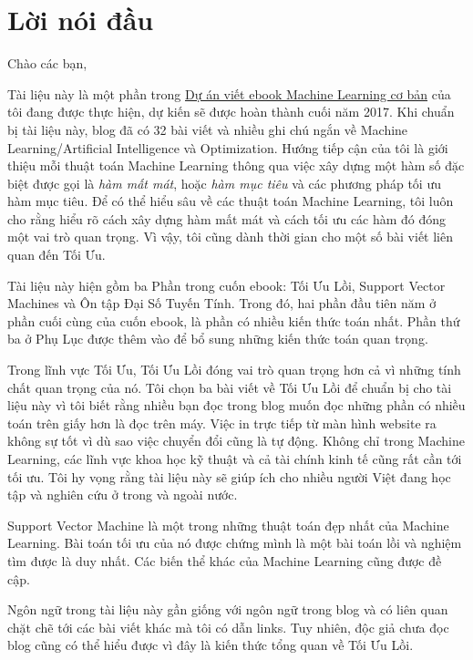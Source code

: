 \chapter{Lời nói đầu }
Chào các bạn,

Tài liệu này là một phần trong \href{https://machinelearningcoban.com/ebook}{Dự án viết ebook Machine Learning cơ bản} của tôi đang được thực hiện, dự kiến sẽ được hoàn thành cuối năm 2017. Khi chuẩn bị tài liệu này, blog đã có 32 bài viết và nhiều ghi chú ngắn về Machine Learning/Artificial Intelligence và Optimization. Hướng tiếp cận của tôi là giới thiệu mỗi thuật toán Machine Learning thông qua việc xây dựng một hàm số đặc biệt được gọi là \textit{hàm mất mát}, hoặc \textit{hàm mục tiêu} và các phương pháp tối ưu hàm mục tiêu. Để có thể hiểu sâu về các thuật toán Machine Learning, tôi luôn cho rằng hiểu rõ cách xây dựng hàm mất mát và cách tối ưu các hàm đó đóng một vai trò quan trọng. Vì vậy, tôi cũng dành thời gian cho một số bài viết liên quan đến Tối Ưu. 

Tài liệu này hiện gồm ba Phần trong cuốn ebook: Tối Ưu Lồi, Support Vector Machines và Ôn tập Đại Số Tuyến Tính. Trong đó, hai phần đầu tiên năm ở phần cuối cùng của cuốn ebook, là phần có nhiều kiến thức toán nhất. Phần thứ ba ở Phụ Lục được thêm vào để bổ sung những kiến thức toán quan trọng.

Trong lĩnh vực Tối Ưu, Tối Ưu Lồi đóng vai trò quan trọng hơn cả vì những tính chất quan trọng của nó. Tôi chọn ba bài viết về Tối Ưu Lồi để chuẩn bị cho tài liệu này vì tôi biết rằng nhiều bạn đọc trong blog muốn đọc những phần có nhiều toán trên giấy hơn là đọc trên máy. Việc in trực tiếp từ màn hình website ra không sự tốt vì dù sao việc chuyển đổi cũng là tự động. Không chỉ trong Machine Learning, các lĩnh vực khoa học kỹ thuật và cả tài chính kinh tế cũng rất cần tới tối ưu. Tôi hy vọng rằng tài liệu này sẽ giúp ích cho nhiều người Việt đang học tập và nghiên cứu ở trong và ngoài nước. 

Support Vector Machine là một trong những thuật toán đẹp nhất của Machine Learning. Bài toán tối ưu của nó được chứng mình là một bài toán lồi và nghiệm tìm được là duy nhất. Các biến thể khác của Machine Learning cũng được đề cập. 

Ngôn ngữ trong tài liệu này gần giống với ngôn ngữ trong blog và có liên quan chặt chẽ tới các bài viết khác mà tôi có dẫn links. Tuy nhiên, độc giả chưa đọc blog cũng có thể hiểu được vì đây là kiến thức tổng quan về Tối Ưu Lồi. 

